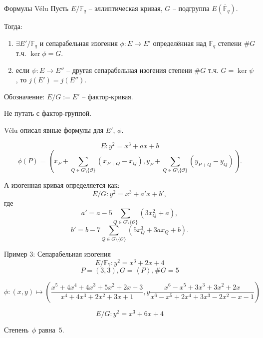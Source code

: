 \documentclass{beamer}
\begin{document}
\begin{frame}{Формулы V\'{e}lu}
Пусть $E/\mathbb{F}_q$ -- эллиптическая кривая, $G$ -- подгруппа $E(\overline{\mathbb{F}}_q)$.
\vspace{0.3em}

Тогда:
\vspace{0.5em}
\begin{enumerate}
    \item $\exists E'/\mathbb{F}_q$ и сепарабельная изогения $\phi: E \rightarrow E'$ определённая над $\mathbb{F}_q$ степени $\#G$ т.ч. $\ker\phi = G$.
    \vspace{0.2em}
    \item если $\psi: E \rightarrow E''$ -- другая сепарабельная изогения степени $\#G$ т.ч. $G = \ker\psi$, то $j(E') = j(E'')$.
\end{enumerate}
\vspace{0.5em}
Обозначение: $E/G := E'$ -- фактор-кривая.

\vspace{0.5em}
 Не путать с фактор-группой.
\end{frame}

\begin{frame}
V\'{e}lu описал явные формулы для $E'$, $\phi$.

\[E: y^2 = x^3 + a x + b\]
\[
\phi(P)
=
\left(
  x_P + \sum_{Q \in G \setminus \{\mathcal{O}\}} \left( x_{P+Q} - x_Q \right),
  y_P + \sum_{Q \in G \setminus \{ \mathcal{O} \}} \left( y_{P+Q} - y_Q \right)
\right).
\]

А изогенная кривая определяется как:
\[E/G: y^2 = x^3 + a' x + b',\] где
\[
a' = a - 5 \sum_{Q \in G \setminus \{ \mathcal{O} \}} \left( 3 x_Q^2 + a \right),
\]
\[
b' = b - 7 \sum_{Q \in G \setminus \{\mathcal{O}\}} \left(
5 x_Q^3 + 3 a x_Q + b
\right).
\]
\end{frame}

\begin{frame}{Пример 3: Сепарабельная изогения}
	\[E/\mathbb{F}_{7}: y^2 = x^3 + 2 x + 4\]
	\[P  = (3,3), G = \left< P \right>, \#G = 5\]
	
	\begin{footnotesize}
	\[\phi: (x,y) \mapsto \left(
	\frac{x^5 + 4 x^4 + 4 x^3 + 5 x^2 + 2 x + 3}{x^4 + 4 x^3 + 2 x^2 + 3 x + 1},
	y\frac{x^6 - x^5 + 3 x^3 + 3 x^2 + 2 x}{x^6 - x^5 + 2 x^4 + 3 x^3 - 2 x^2 - x - 1} \right)
	\]
	\end{footnotesize}
	
	\[E/G: y^2 = x^3 + 6 x + 4\]
	\begin{center}
	Степень~$\phi$ равна~$5$.
	\end{center}
\end{frame}
\end{document}

